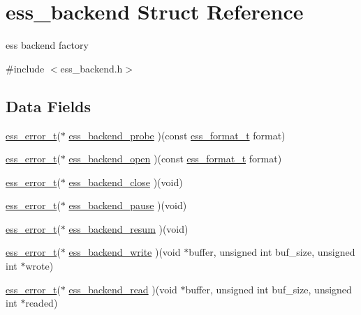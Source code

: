 \hypertarget{structess__backend}{}\section{ess\+\_\+backend Struct Reference}
\label{structess__backend}


ess backend factory  




{\ttfamily \#include $<$ess\+\_\+backend.\+h$>$}

\subsection*{Data Fields}
\begin{DoxyCompactItemize}
\item 
\hyperlink{ess__error_8h_a08ab97fcf6745dee67de912e41bd3236}{ess\+\_\+error\+\_\+t}($\ast$ \hyperlink{structess__backend_a7a51d8dd3864c93fb26e193353e0f3bd}{ess\+\_\+backend\+\_\+probe} )(const \hyperlink{ess__format_8h_a9aa23f58a25b9e8360c1400e0cadfd80}{ess\+\_\+format\+\_\+t} format)
\item 
\hyperlink{ess__error_8h_a08ab97fcf6745dee67de912e41bd3236}{ess\+\_\+error\+\_\+t}($\ast$ \hyperlink{structess__backend_a52aa7fbd63ffa3f65a00412b27a25191}{ess\+\_\+backend\+\_\+open} )(const \hyperlink{ess__format_8h_a9aa23f58a25b9e8360c1400e0cadfd80}{ess\+\_\+format\+\_\+t} format)
\item 
\hyperlink{ess__error_8h_a08ab97fcf6745dee67de912e41bd3236}{ess\+\_\+error\+\_\+t}($\ast$ \hyperlink{structess__backend_a5a1aab40f4f3d907977dd2ebd35b1316}{ess\+\_\+backend\+\_\+close} )(void)
\item 
\hyperlink{ess__error_8h_a08ab97fcf6745dee67de912e41bd3236}{ess\+\_\+error\+\_\+t}($\ast$ \hyperlink{structess__backend_ad32efdc09b8cce643d02f7d4ace79aab}{ess\+\_\+backend\+\_\+pause} )(void)
\item 
\hyperlink{ess__error_8h_a08ab97fcf6745dee67de912e41bd3236}{ess\+\_\+error\+\_\+t}($\ast$ \hyperlink{structess__backend_aa5ece62a4dd25976842c9acd64250de9}{ess\+\_\+backend\+\_\+resum} )(void)
\item 
\hyperlink{ess__error_8h_a08ab97fcf6745dee67de912e41bd3236}{ess\+\_\+error\+\_\+t}($\ast$ \hyperlink{structess__backend_a952c8ea376b49dfe0af1c1ef030c159d}{ess\+\_\+backend\+\_\+write} )(void $\ast$buffer, unsigned int buf\+\_\+size, unsigned int $\ast$wrote)
\item 
\hyperlink{ess__error_8h_a08ab97fcf6745dee67de912e41bd3236}{ess\+\_\+error\+\_\+t}($\ast$ \hyperlink{structess__backend_adc20c36a5a02674fd2f200413ec4efb6}{ess\+\_\+backend\+\_\+read} )(void $\ast$buffer, unsigned int buf\+\_\+size, unsigned int $\ast$readed)

\end{DoxyCompactItemize}

